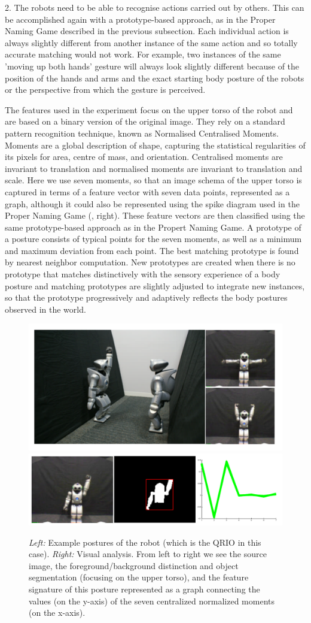 2. The robots need to be able to recognise actions carried out by others. This can be accomplished again 
with a prototype-based approach, as in the Proper Naming Game described in the previous subsection. Each individual action 
is always slightly different from another instance of the same action and so totally accurate matching would not work. 
For example, two instances of the same 'moving up both hands' gesture will always look slightly different because of the 
position of the hands and arms and the exact starting body posture of the robots or the perspective from which 
the gesture is perceived. 

The features used in the experiment focus on the upper torso of the robot and are based on a binary 
version of the original image. They rely on a standard pattern recognition technique, known as Normalised 
Centralised Moments.\cite{Hu:1962} 
Moments are a global description of shape, capturing the statistical regularities
of its pixels for area, centre of mass, and orientation. Centralised moments are invariant to translation and 
normalised moments are invariant to translation and scale. Here we use seven moments, so that an image schema of 
the upper torso is captured in terms of a feature vector with seven data points, represented as a graph, 
although it could also be represented using the spike diagram used in the Proper Naming Game (, right). 
These feature vectors are then classified using the same prototype-based approach as in the Propert Naming Game. A prototype of a posture 
consists of typical points for the seven moments, as well as a minimum and maximum deviation from 
each point. The best matching prototype is found by nearest neighbor computation. New prototypes are created 
when there is no prototype that matches distinctively with the sensory experience of a body posture and matching prototypes are
slightly adjusted to integrate new instances, so that the prototype progressively and adaptively reflects the body postures observed
in the world. 

\begin{figure}
\centerline{\includegraphics[width=0.2\linewidth]{chap11/figs/postures.pdf}\includegraphics[width=0.75\linewidth]{chap11/figs/vision_2.pdf}}
\caption{\label{vision} \footnotesize{{\itshape Left:} Example postures of the robot (which is the QRIO in this case).
{\itshape Right:} Visual analysis. From left to right we see the source image, the foreground/background distinction and object segmentation (focusing on the upper torso), and the feature signature of this posture represented as a graph connecting the values (on the y-axis)
of the seven centralized normalized moments (on the x-axis).}}
\end{figure}

